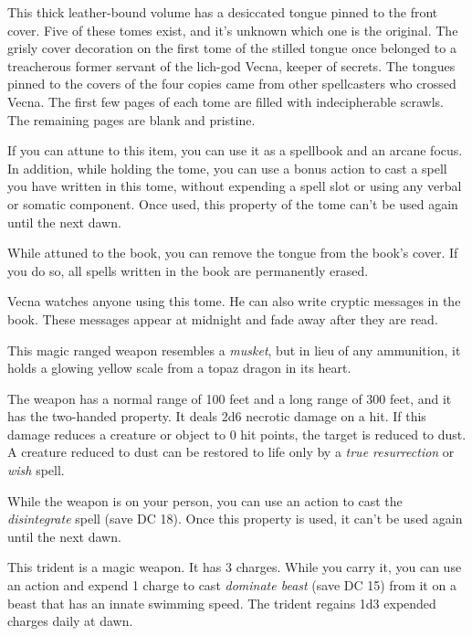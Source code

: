 \documentclass[10pt,a4paper,twoside,bg=print,twocolumn,openany,nodeprecatedcode]{dndbook}
\begin{document}
This thick leather-bound volume has a desiccated tongue pinned to the front cover. Five of these tomes exist, and it's unknown which one is the original. The grisly cover decoration on the first tome of the stilled tongue once belonged to a treacherous former servant of the lich-god Vecna, keeper of secrets. The tongues pinned to the covers of the four copies came from other spellcasters who crossed Vecna. The first few pages of each tome are filled with indecipherable scrawls. The remaining pages are blank and pristine.

If you can attune to this item, you can use it as a spellbook and an arcane focus. In addition, while holding the tome, you can use a bonus action to cast a spell you have written in this tome, without expending a spell slot or using any verbal or somatic component. Once used, this property of the tome can't be used again until the next dawn.

While attuned to the book, you can remove the tongue from the book's cover. If you do so, all spells written in the book are permanently erased.

Vecna watches anyone using this tome. He can also write cryptic messages in the book. These messages appear at midnight and fade away after they are read.

This magic ranged weapon resembles a \textit{musket}, but in lieu of any ammunition, it holds a glowing yellow scale from a topaz dragon in its heart.

The weapon has a normal range of 100 feet and a long range of 300 feet, and it has the two-handed property. It deals 2d6 necrotic damage on a hit. If this damage reduces a creature or object to 0 hit points, the target is reduced to dust. A creature reduced to dust can be restored to life only by a \textit{true resurrection} or \textit{wish} spell.

While the weapon is on your person, you can use an action to cast the \textit{disintegrate} spell (save DC 18). Once this property is used, it can't be used again until the next dawn.

This trident is a magic weapon. It has 3 charges. While you carry it, you can use an action and expend 1 charge to cast \textit{dominate beast} (save DC 15) from it on a beast that has an innate swimming speed. The trident regains 1d3 expended charges daily at dawn.
\end{document}
